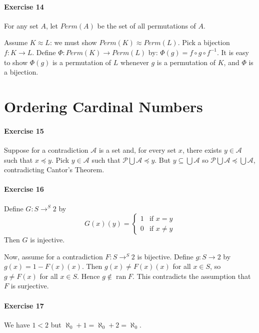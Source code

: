 \documentclass{report}
\newcommand{\ran}{\ensuremath{\operatorname{ran}}}
\newcommand{\inv}[1]{\ensuremath{{#1}^{-1}}}
\begin{document}
    \paragraph{Exercise 14}
    For any set $A$, let $Perm(A)$ be the set of all permutations of $A$.

    Assume $K \approx L$: we must show $Perm(K) \approx Perm(L)$. Pick a bijection $f : K \rightarrow L$.
    Define $\Phi : Perm(K) \rightarrow Perm(L)$ by: $\Phi(g) = f \circ g \circ \inv{f}$. It is easy to
    show $\Phi(g)$ is a permutation of $L$ whenever $g$ is a permutation of $K$, and $\Phi$ is a bijection.

    \section{Ordering Cardinal Numbers}

    \paragraph{Exercise 15}
    Suppose for a contradiction $\mathcal{A}$ is a set and, for every set $x$, there exists $y \in \mathcal{A}$
    such that $x \preccurlyeq y$. Pick $y \in \mathcal{A}$ such that $\mathcal{P} \bigcup \mathcal{A} \preccurlyeq y$.
    But $y \subseteq \bigcup \mathcal{A}$ so $\mathcal{P} \bigcup \mathcal{A} \preccurlyeq \bigcup \mathcal{A}$,
    contradicting Cantor's Theorem.

    \paragraph{Exercise 16}
    Define $G : S \rightarrow ^S 2$ by
    \[ G(x)(y) = \begin{cases}
        1 & \text{if } x = y \\
        0 & \text{if } x \neq y
    \end{cases} \]
    Then $G$ is injective.

    Now, assume for a contradiction $F : S \rightarrow ^S 2$ is bijective. Define $g : S \rightarrow 2$ by
    $g(x) = 1 - F(x)(x)$. Then $g(x) \neq F(x)(x)$ for all $x \in S$, so $g \neq F(x)$ for all $x \in S$.
    Hence $g \notin \ran F$. This contradicts the assumption that $F$ is surjective.

    \paragraph{Exercise 17}
    We have $1 < 2$ but $\aleph_0 + 1 = \aleph_0 + 2 = \aleph_0$.
\end{document}
